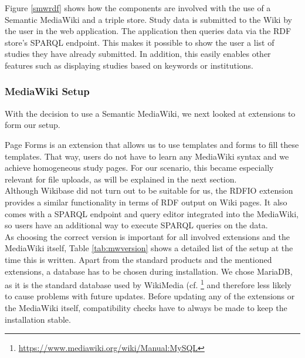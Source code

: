\documentclass[10pt]{article}
\begin{document}
Figure \ref{smwrdf} shows how the components are involved with the use of a Semantic MediaWiki and a triple store. Study data is submitted to the Wiki by the user in the web application. The application then queries data via the RDF store's SPARQL endpoint. This makes it possible to show the user a list of studies they have already submitted. In addition, this easily enables other features such as displaying studies based on keywords or institutions.\\


\subsubsection{MediaWiki Setup}
With the decision to use a Semantic MediaWiki, we next looked at extensions to form our setup. 

Page Forms is an extension that allows us to use templates and forms to fill these templates. That way, users do not have to learn any MediaWiki syntax and we achieve homogeneous study pages. For our scenario, this became especially relevant for file uploads, as will be explained in the next section. \\

Although Wikibase did not turn out to be suitable for us, the RDFIO extension provides a similar functionality in terms of RDF output on Wiki pages. It also comes with a SPARQL endpoint and query editor integrated into the MediaWiki, so users have an additional way to execute SPARQL queries on the data. \\

As choosing the correct version is important for all involved extensions and the MediaWiki itself, Table \ref{tab:mwversion} shows a detailed list of the setup at the time this is written. Apart from the standard products and the mentioned extensions, a database has to be chosen during installation. We chose MariaDB, as it is the standard database used by WikiMedia (cf. \footnote{\url{https://www.mediawiki.org/wiki/Manual:MySQL}} and therefore less likely to cause problems with future updates. Before updating any of the extensions or the MediaWiki itself, compatibility checks have to always be made to keep the installation stable. 
\end{document}

